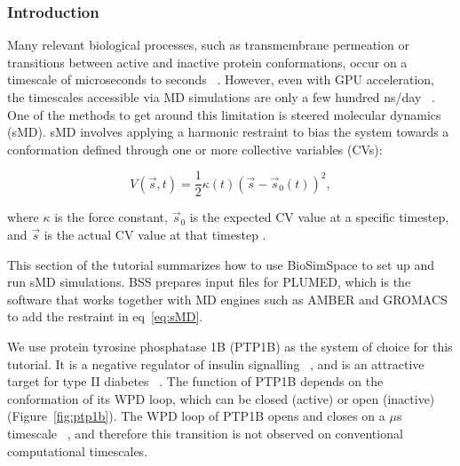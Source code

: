 \subsubsection{Introduction}
Many relevant biological processes, such as transmembrane permeation or transitions between active and inactive protein conformations, occur on a timescale of microseconds to seconds ~\cite{Zwier2010,Choy2017,Wells2007}. However, even with GPU acceleration, the timescales accessible via MD simulations are only a few hundred ns/day ~\cite{HecBioSim_benchmark}. One of the methods to get around this limitation is steered molecular dynamics (sMD). sMD involves applying a harmonic restraint to bias the system towards a conformation defined through one or more collective variables (CVs):

\begin{equation}
V(\vec{s},t) = \frac{1}{2} \kappa(t) ( \vec{s} - \vec{s}_0(t) )^2,
\label{eq:sMD}
\end{equation}

where $\kappa$ is the force constant, $\vec{s}_0$ is the expected CV value at a specific timestep, and $\vec{s}$ is the actual CV value at that timestep \cite{Isralewitz2001,Tribello2014}.

This section of the tutorial summarizes how to use BioSimSpace to set up and run sMD simulations. BSS prepares input files for PLUMED, which is the software that works together with MD engines such as AMBER and GROMACS to add the restraint in eq~\ref{eq:sMD}.

We use protein tyrosine phosphatase 1B (PTP1B) as the system of choice for this tutorial. It is a negative regulator of insulin signalling ~\cite{sMD_ptp1b-diabetes}, and is an attractive target for type II diabetes ~\cite{sMD_Wiesman}. The function of PTP1B depends on the conformation of its WPD loop, which can be closed (active) or open (inactive) (Figure~\ref{fig:ptp1b}). The WPD loop of PTP1B opens and closes on a $\mu$s timescale ~\cite{Choy2017}, and therefore this transition is not observed on conventional computational timescales.

